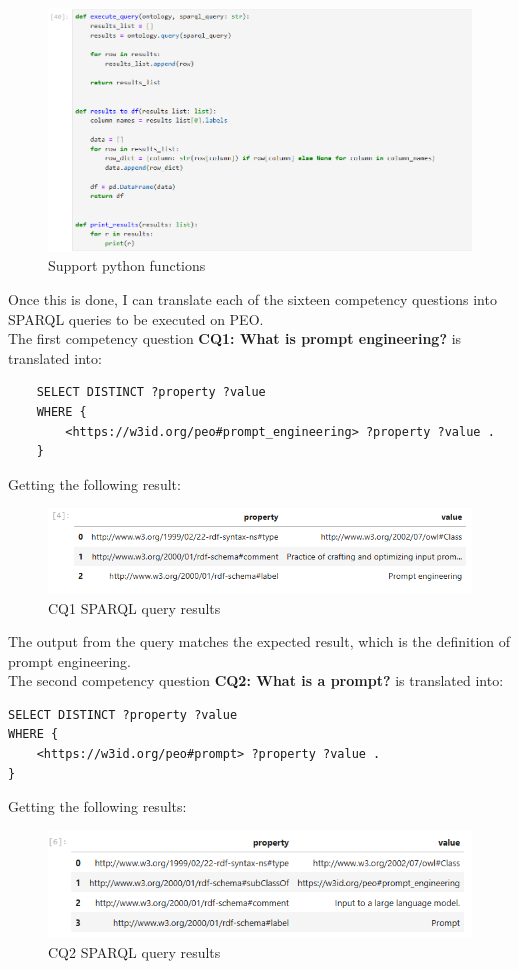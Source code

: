 \begin{figure}[H]
    \centering
    \includegraphics[width=0.9\linewidth]{Figures/fig_46.png}
    \caption{Support python functions}
    \label{fig:enter-label}
\end{figure}

Once this is done, I can translate each of the sixteen competency questions into SPARQL queries to be executed on PEO.\\
The first competency question \textbf{CQ1: What is prompt engineering?} is translated into:
\begin{lstlisting}
    SELECT DISTINCT ?property ?value
    WHERE {
        <https://w3id.org/peo#prompt_engineering> ?property ?value .
    }
\end{lstlisting}
Getting the following result:
\begin{figure}[H]
    \centering
    \includegraphics[width=0.9\linewidth]{Figures/fig_47.png}
    \caption{CQ1 SPARQL query results}
    \label{fig:enter-label}
\end{figure}
The output from the query matches the expected result, which is the definition of prompt engineering.\\

The second competency question \textbf{CQ2: What is a prompt?} is translated into:
\begin{lstlisting}
SELECT DISTINCT ?property ?value
WHERE {
    <https://w3id.org/peo#prompt> ?property ?value .
}
\end{lstlisting}
Getting the following results:
\begin{figure}[H]
    \centering
    \includegraphics[width=0.9\linewidth]{Figures/fig_48.png}
    \caption{CQ2 SPARQL query results}
    \label{fig:enter-label}
\end{figure}

